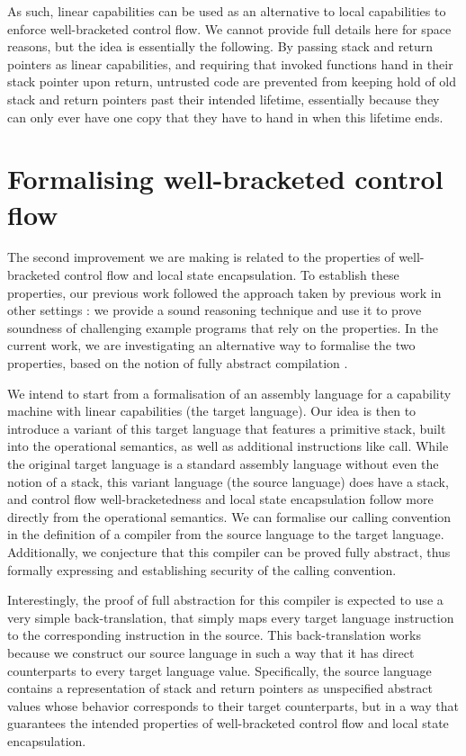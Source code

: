 \documentclass[sigplan, review]{acmart}
\begin{document}
As such, linear capabilities can be used as an alternative to local capabilities to enforce well-bracketed control flow.
We cannot provide full details here for space reasons, but the idea is essentially the following.
By passing stack and return pointers as linear capabilities, and requiring that invoked functions hand in their stack pointer upon return, untrusted code are prevented from keeping hold of old stack and return pointers past their intended lifetime, essentially because they can only ever have one copy that they have to hand in when this lifetime ends.

\section{Formalising well-bracketed control flow}
The second improvement we are making is related to the properties of well-bracketed control flow and local state encapsulation.
To establish these properties, our previous work followed the approach taken by previous work in other settings \citep{dreyer_impact_2010}: we provide a sound reasoning technique and use it to prove soundness of challenging example programs that rely on the properties.
In the current work, we are investigating an alternative way to formalise the two properties, based on the notion of fully abstract compilation \citep{abadi_protection_1999}.

We intend to start from a formalisation of an assembly language for a capability machine with linear capabilities (the target language).
Our idea is then to introduce a variant of this target language that features a primitive stack, built into the operational semantics, as well as additional instructions like call.
While the original target language is a standard assembly language without even the notion of a stack, this variant language (the source language) does have a stack, and control flow well-bracketedness and local state encapsulation follow more directly from the operational semantics.
We can formalise our calling convention in the definition of a compiler from the source language to the target language.
Additionally, we conjecture that this compiler can be proved fully abstract, thus formally expressing and establishing security of the calling convention.

Interestingly, the proof of full abstraction for this compiler is expected to use a very simple back-translation, that simply maps every target language instruction to the corresponding instruction in the source.
This back-translation works because we construct our source language in such a way that it has direct counterparts to every target language value.
Specifically, the source language contains a representation of stack and return pointers as unspecified abstract values whose behavior corresponds to their target counterparts, but in a way that guarantees the intended properties of well-bracketed control flow and local state encapsulation.


 
\end{document}
